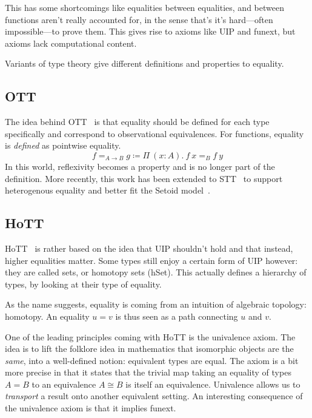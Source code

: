 This has some shortcomings like equalities between equalities, and between
functions aren't really accounted for, in the sense that's it's hard---often
impossible---to prove them.
This gives rise to axioms like \acrshort{UIP} and \acrshort{funext}, but axioms
lack computational content.

Variants of type theory give different definitions and properties to equality.

\subsection{\acrfull{OTT}}

The idea behind \acrshort{OTT}~ is that
equality should be defined for each type specifically and correspond to
observational equivalences. For functions, equality is \emph{defined} as
pointwise equality.
\[
  f =_{A \to B} g \coloneqq \Pi\ (x : A).\ f\ x =_B f\ y
\]
In this world, reflexivity becomes a property and is no longer part of the
definition.
More recently, this work has been extended to
\acrfull{STT}~ to support heterogenous equality
and better fit the Setoid model~.

\subsection{\acrfull{HoTT}}

\acrshort{HoTT}~ is rather based on the idea that
\acrshort{UIP} shouldn't hold and that instead, higher equalities matter.
Some types still enjoy a certain form of \acrshort{UIP} however: they are called
sets, or homotopy sets (hSet). This actually defines a hierarchy of types, by
looking at their type of equality.

As the name suggests, equality is coming from an intuition of algebraic
topology: homotopy. An equality \(u = v\) is thus seen as a path connecting
\(u\) and \(v\).

 One of the leading principles coming with \acrshort{HoTT}
is the univalence axiom. The idea is to lift the folklore idea in mathematics
that isomorphic objects are the \emph{same}, into a well-defined notion:
equivalent types are equal.
The axiom is a bit more precise in that it states that the trivial map
taking an equality of types \(A = B\) to an equivalence \(A \cong B\)
is itself an equivalence.
Univalence allows us to \emph{transport} a result onto another equivalent
setting.
An interesting consequence of the univalence axiom is that it implies
\acrshort{funext}.

